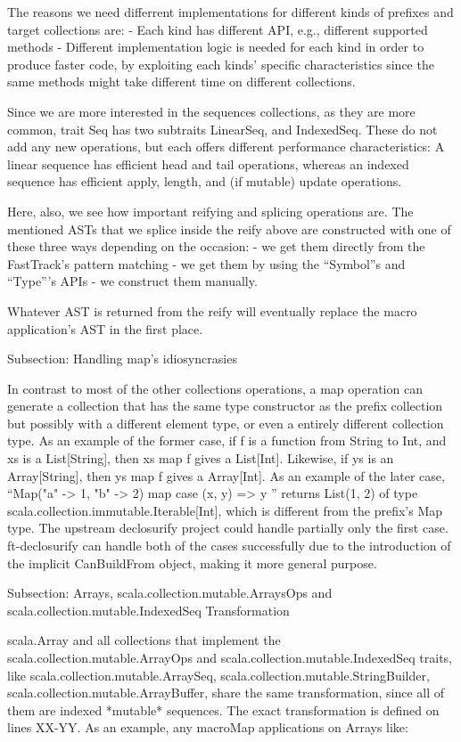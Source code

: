 The reasons we need differrent implementations for different kinds of
prefixes and target collections are:
- Each kind has different API, e.g., different supported methods
- Different implementation logic is needed for each kind in order to produce
faster code, by exploiting each kinds' specific characteristics since the same
methods might take different time on different collections.

Since we are more interested in the sequences collections, as they are more
common, trait Seq has two subtraits LinearSeq, and IndexedSeq. These do not add
any new operations, but each offers different performance characteristics: A
linear sequence has efficient head and tail operations, whereas an indexed
sequence has efficient apply, length, and (if mutable) update operations. 

Here, also, we see how important reifying and splicing operations are. The
mentioned ASTs that we splice inside the reify above are constructed with one of
these three ways depending on the occasion:
- we get them directly from the FastTrack's pattern matching
- we get them by using the ``Symbol''s and ``Type'''s APIs
- we construct them manually.

Whatever AST is returned from the reify will eventually replace the macro
application's AST in the first place.


Subsection: Handling map's idiosyncrasies

In contrast to most of the other collections operations, a map operation can
generate a collection that has the same type constructor as the prefix
collection but possibly with a different element type, or even a entirely
different collection type. As an example of the former case, if f is a function
from String to Int, and xs is a List[String], then xs map f gives a List[Int].
Likewise, if ys is an Array[String], then ys map f gives a Array[Int]. As an
example of the later case,   ``Map("a" -> 1, "b" -> 2) map { case (x, y) => y
}'' returns List(1, 2) of type scala.collection.immutable.Iterable[Int],
which is different from the prefix's Map type. The upstream declosurify project
could handle partially only the first case. ft-declosurify can handle both of
the cases successfully due to the introduction of the implicit CanBuildFrom
object, making it more general purpose.


Subsection: Arrays, scala.collection.mutable.ArraysOps and
scala.collection.mutable.IndexedSeq Transformation

scala.Array and all collections that implement the 
scala.collection.mutable.ArrayOps and scala.collection.mutable.IndexedSeq
traits, like scala.collection.mutable.ArraySeq,
scala.collection.mutable.StringBuilder, scala.collection.mutable.ArrayBuffer,
share the same transformation, since all of them are indexed *mutable*
sequences. The exact transformation is defined on lines XX-YY. As an example,
any macroMap applications on Arrays like:

